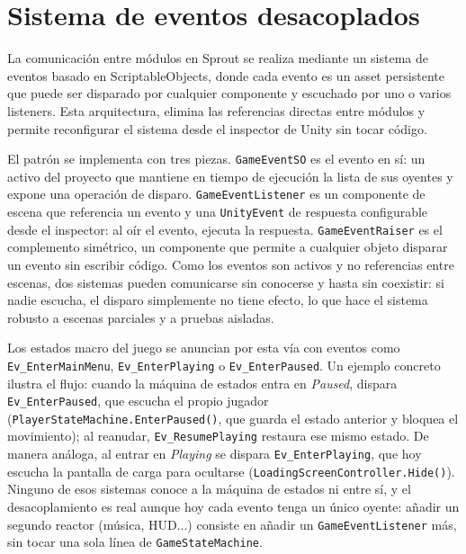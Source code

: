 \documentclass[12pt,twoside,titlepage]{report}
\begin{document}
\section{Sistema de eventos desacoplados}

La comunicación entre módulos en Sprout se realiza mediante un sistema de eventos basado en ScriptableObjects, donde cada evento es un asset persistente que puede ser disparado por cualquier componente y escuchado por uno o varios listeners. Esta arquitectura, elimina las referencias directas entre módulos y permite reconfigurar el sistema desde el inspector de Unity sin tocar código.

El patrón se implementa con tres piezas. \texttt{GameEventSO} es el evento en sí: un activo del proyecto que mantiene en tiempo de ejecución la lista de sus oyentes y expone una operación de disparo. \texttt{GameEventListener} es un componente de escena que referencia un evento y una \texttt{UnityEvent} de respuesta configurable desde el inspector: al oír el evento, ejecuta la respuesta. \texttt{GameEventRaiser} es el complemento simétrico, un componente que permite a cualquier objeto disparar un evento sin escribir código. Como los eventos son activos y no referencias entre escenas, dos sistemas pueden comunicarse sin conocerse y hasta sin coexistir: si nadie escucha, el disparo simplemente no tiene efecto, lo que hace el sistema robusto a escenas parciales y a pruebas aisladas.

\begin{sloppypar}
Los estados macro del juego se anuncian por esta vía con eventos como \texttt{Ev\_EnterMainMenu}, \texttt{Ev\_EnterPlaying} o \texttt{Ev\_EnterPaused}. Un ejemplo concreto ilustra el flujo: cuando la máquina de estados entra en \textit{Paused}, dispara \texttt{Ev\_EnterPaused}, que escucha el propio jugador (\texttt{PlayerStateMachine.EnterPaused()}, que guarda el estado anterior y bloquea el movimiento); al reanudar, \texttt{Ev\_ResumePlaying} restaura ese mismo estado. De manera análoga, al entrar en \textit{Playing} se dispara \texttt{Ev\_EnterPlaying}, que hoy escucha la pantalla de carga para ocultarse (\texttt{LoadingScreenController.Hide()}). Ninguno de esos sistemas conoce a la máquina de estados ni entre sí, y el desacoplamiento es real aunque hoy cada evento tenga un único oyente: añadir un segundo reactor (música, HUD...) consiste en añadir un \texttt{GameEventListener} más, sin tocar una sola línea de \texttt{GameStateMachine}.
\end{sloppypar}
\end{document}
